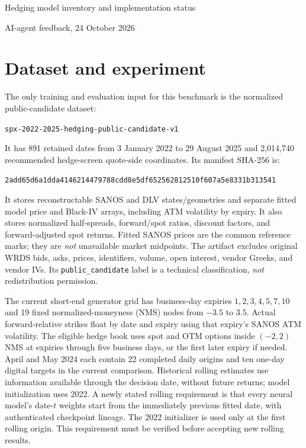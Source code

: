 \documentclass[10pt]{article}
\begin{document}
\begin{center}
  {\LARGE Hedging model inventory and implementation status}\par
  {\large AI-agent feedback, 24 October 2026}
\end{center}

\noindent{}

\section{Dataset and experiment}

The only training and evaluation input for this benchmark is the normalized
public-candidate dataset:
\begin{center}
\texttt{spx-2022-2025-hedging-public-candidate-v1}
\end{center}
It has 891 retained dates from 3 January 2022 to 29 August 2025 and
2,014,740 recommended hedge-screen quote-side coordinates. Its manifest
SHA-256 is:
\begin{center}\small
\texttt{2add65d6a1dda4146214479788cdd8e5df652562812510f607a5e8331b313541}
\end{center}
It stores reconstructable SANOS and DLV states/geometries and separate fitted
model price and Black-IV arrays, including ATM volatility by expiry. It also
stores normalized half-spreads, forward/spot ratios, discount factors, and
forward-adjusted spot returns. Fitted SANOS prices are the common reference
marks; they are \emph{not} unavailable market midpoints. The artifact excludes
original WRDS bids, asks, prices, identifiers, volume, open interest, vendor
Greeks, and vendor IVs. Its \texttt{public\_candidate} label is a technical
classification, \emph{not} redistribution permission.

The current short-end generator grid has business-day expiries
$1,2,3,4,5,7,10$ and 19 fixed normalized-moneyness (NMS) nodes from $-3.5$
to $3.5$. Actual forward-relative strikes float by date and expiry using that
expiry's SANOS ATM volatility. The eligible hedge book uses spot and OTM
options inside $(-2,2)$ NMS at expiries through five business days, or the
first later expiry if needed. April and May 2024 each contain 22 completed
daily origins and ten one-day digital targets in the current comparison.
Historical rolling estimates use information available through the decision
date, without future returns; model initialization uses 2022. A newly stated
rolling requirement is that every neural model's date-$t$ weights start from
the immediately previous fitted date, with authenticated checkpoint lineage.
The 2022 initializer is used only at the first rolling origin. This requirement
must be verified before accepting new rolling results.
\end{document}

